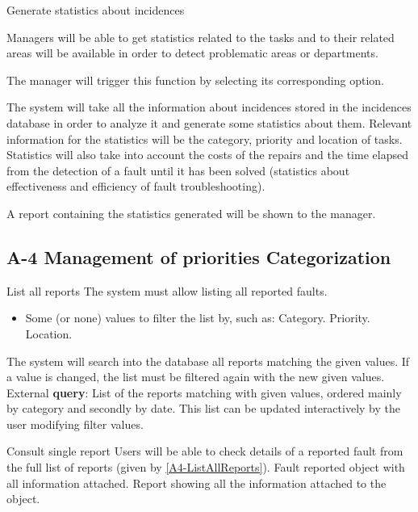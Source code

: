 \begin{requirement}{Generate statistics about incidences}

\reqdesc Managers will be able to get statistics related to the tasks and to their related areas will be available in order to
detect problematic areas or departments.

\reqin The manager will trigger this function by selecting its corresponding option.

\reqsteps The system will take all the information about incidences stored in the incidences database in order to analyze it and generate some statistics about them. Relevant information for the statistics will be the category, priority and location of tasks. Statistics will also take into account the costs of the repairs and the time elapsed from the detection of a fault until it has been solved (statistics about effectiveness and efficiency of fault troubleshooting).

\reqout A report containing the statistics generated will be shown to the manager.

\end{requirement}



\subsection{A-4 Management of priorities Categorization}
\begin{requirement}{List all reports}\label{A4-ListAllReports}
\reqdesc The system must allow listing all reported faults.
\reqin 
\begin{itemize}
 	\item Some (or none) values to filter the list by, such as:
 		\subitem Category.
 		\subitem Priority.
 		\subitem Location.
 \end{itemize}
\reqsteps The system will search into the database all reports matching the given values. If a value is changed, the list must be filtered again with the new given values.
\reqout External \textbf{query}: List of the reports matching with given values, ordered mainly by category and secondly by date. This list can be updated interactively by the user modifying filter values.
\end{requirement}

\begin{requirement}{Consult single report}
\reqdesc Users will be able to check details of a reported fault from the full list of reports (given by \ref{A4-ListAllReports}).
\reqin Fault reported object with all information attached.
\reqout Report showing all the information attached to the object.
\end{requirement}

